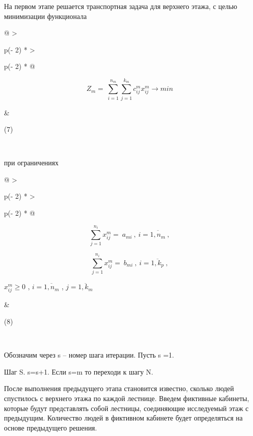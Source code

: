 \documentclass[
]{article}
\begin{document}
На первом этапе решается транспортная задача для верхнего этажа, с целью
минимизации функционала

\begin{longtable}[]{@{}
  >{\raggedright\arraybackslash}p{(\columnwidth - 2\tabcolsep) * }
  >{\raggedright\arraybackslash}p{(\columnwidth - 2\tabcolsep) * }@{}}
\toprule\noalign{}
\begin{minipage}[b]{\linewidth}\raggedright
\[Z_{m} = \ \sum_{i = 1}^{n_{m}}{\sum_{j = 1}^{k_{m}}{c_{ij}^{m}x_{ij}^{m} \rightarrow min}}\]
\end{minipage} & \begin{minipage}[b]{\linewidth}\raggedright
(7)
\end{minipage} \\
\midrule\noalign{}
\endhead
\bottomrule\noalign{}
\endlastfoot
\end{longtable}

при ограничениях

\begin{longtable}[]{@{}
  >{\raggedright\arraybackslash}p{(\columnwidth - 2\tabcolsep) * }
  >{\raggedright\arraybackslash}p{(\columnwidth - 2\tabcolsep) * }@{}}
\toprule\noalign{}
\begin{minipage}[b]{\linewidth}\raggedright
\[\sum_{j = 1}^{n_{i}}x_{ij}^{m} = \ a_{mi}\ ,\ i = \overline{1,n_{m}}\ ,\]

\[\sum_{j = 1}^{n_{i}}x_{ij}^{m} = \ b_{mi}\ ,\ i = \overline{1,k_{p}}\ ,\]

\(x_{ij}^{m} \geq 0\) , \(i = \overline{1,n_{m}}\) ,
\(j = \overline{1,k_{m}}\)
\end{minipage} & \begin{minipage}[b]{\linewidth}\raggedright
(8)
\end{minipage} \\
\midrule\noalign{}
\endhead
\bottomrule\noalign{}
\endlastfoot
\end{longtable}

Обозначим через s -- номер шага итерации. Пусть s =1.

Шаг S. s=s+1. Если s=m то переходи к шагу N.

После выполнения предыдущего этапа становится известно, сколько людей
спустилось с верхнего этажа по каждой лестнице. Введем фиктивные
кабинеты, которые будут представлять собой лестницы, соединяющие
исследуемый этаж с предыдущим. Количество людей в фиктивном кабинете
будет определяться на основе предыдущего решения.
\end{document}
